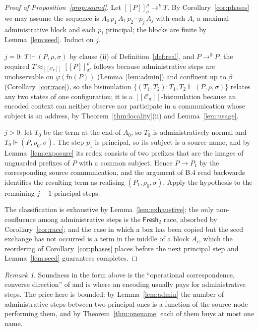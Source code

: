 \documentclass[11pt]{article}
\theoremstyle{definition}
\theoremstyle{plain}
\theoremstyle{remark}
\newtheorem{remark}[definition]{Remark}
\newcommand{\enc}[1]{[\![#1]\!]}
\newcommand{\Frsh}{\mathsf{Fresh}_2}
\newcommand{\Ctx}{\mathscr{C}}
\newcommand{\bisim}{\approx}
\newcommand{\real}{\Vdash}
\newcommand{\fn}{\mathrm{fn}}
\begin{document}
\begin{proof}[Proof of Proposition~\ref{prop:sound}]
Let $\enc{P}^\rho_\sigma \to^{k} T$. By Corollary~\ref{cor:phases} we may
assume the sequence is $A_0\,p_1\,A_1\,p_2 \cdots p_j\,A_j$ with each
$A_i$ a maximal administrative block and each $p_i$ principal; the blocks
are finite by Lemma~\ref{lem:seed}. Induct on $j$.

$j = 0$: $T \real (P,\rho,\sigma)$ by clause (ii) of
Definition~\ref{def:real}, and $P \to^{0} P$; the required
$T \bisim_{\enc{\Ctx_\pi}} \enc{P}^{\rho}_{\sigma'}$ follows because
administrative steps are unobservable on $\varphi(\fn(P))$
(Lemma~\ref{lem:admin}) and confluent up to $\beta$
(Corollary~\ref{cor:race}), so the bisimulation
$\{(T_1,T_2) : T_1,T_2 \real (P,\rho,\sigma)\}$ relates any two states of
one configuration; it is a $\enc{\Ctx_\pi}$-bisimulation because an
encoded context can neither observe nor participate in a communication
whose subject is an address, by Theorem~\ref{thm:locality}(ii) and
Lemma~\ref{lem:usage}.

$j > 0$: let $T_0$ be the term at the end of $A_0$, so $T_0$ is
administratively normal and $T_0 \real (P,\rho_0,\sigma)$. The step $p_1$
is principal, so its subject is a source name, and by
Lemma~\ref{lem:exposure} its redex consists of two prefixes that are the
images of unguarded prefixes of $P$ with a common subject. Hence
$P \to P_1$ by the corresponding source communication, and the argument of
B.4 read backwards identifies the resulting term as realising
$(P_1,\rho_0,\sigma)$. Apply the hypothesis to the remaining
$j-1$ principal steps.

The classification is exhaustive by Lemma~\ref{lem:exhaustive}; the only
non-confluence among administrative steps is the $\Frsh$ race, absorbed by
Corollary~\ref{cor:race}; and the case in which a box has been copied but
the seed exchange has not occurred is a term in the middle of a block
$A_i$, which the reordering of Corollary~\ref{cor:phases} places before
the next principal step and Lemma~\ref{lem:seed} guarantees completes.
\end{proof}

\begin{remark}
Soundness in the form above is the ``operational correspondence, converse
direction'' of \cite{Gorla10} and is where an encoding usually pays for
administrative steps. The price here is bounded: by
Lemma~\ref{lem:admin} the number of administrative steps between two
principal ones is a function of the source node performing them, and by
Theorem~\ref{thm:onename} each of them buys at most one name.
\end{remark}
\end{document}
